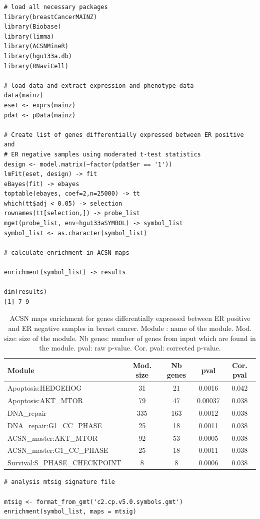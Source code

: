 \documentclass[article]{jss}
\begin{document}
\begin{verbatim}
# load all necessary packages
library(breastCancerMAINZ)
library(Biobase)
library(limma)
library(ACSNMineR)
library(hgu133a.db)
library(RNaviCell)

# load data and extract expression and phenotype data 
data(mainz)
eset <- exprs(mainz)
pdat <- pData(mainz)

# Create list of genes differentially expressed between ER positive and 
# ER negative samples using moderated t-test statistics 
design <- model.matrix(~factor(pdat$er == '1'))
lmFit(eset, design) -> fit
eBayes(fit) -> ebayes
toptable(ebayes, coef=2,n=25000) -> tt
which(tt$adj < 0.05) -> selection
rownames(tt[selection,]) -> probe_list
mget(probe_list, env=hgu133aSYMBOL) -> symbol_list
symbol_list <- as.character(symbol_list)

# calculate enrichment in ACSN maps 

enrichment(symbol_list) -> results

dim(results)
[1] 7 9
\end{verbatim}

\begin{table}[h!]
  \centering
  \caption{ACSN maps enrichment for genes differentially expressed between ER
positive and ER negative samples in breast cancer.  Module : name of the
module. Mod. size: size of the module. Nb genes: number of genes from input
which are found in the module. pval: raw p-value. Cor. pval: corrected p-value.}
\label{tab:table_mainz}

\begin{tabular}{l|c|c|c|c}
\hline
Module & Mod. size & Nb genes & pval & Cor. pval\\
\hline
Apoptosis:HEDGEHOG & 31 & 21 & 0.0016 & 0.042 \\
Apoptosis:AKT\_MTOR &  79 & 47 & 0.00037 & 0.038 \\
DNA\_repair & 335 & 163 & 0.0012 & 0.038 \\
DNA\_repair:G1\_CC\_PHASE &  25 & 18 & 0.0011 & 0.038 \\
ACSN\_master:AKT\_MTOR & 92 & 53 & 0.0005 & 0.038 \\
ACSN\_master:G1\_CC\_PHASE & 25 & 18 & 0.0011 & 0.038 \\
Survival:S\_PHASE\_CHECKPOINT & 8 & 8 & 0.0006 & 0.038 \\
\hline

\end{tabular}
\end{table}

\begin{verbatim}
# analysis mtsig signature file

mtsig <- format_from_gmt('c2.cp.v5.0.symbols.gmt')
enrichment(symbol_list, maps = mtsig)

\end{verbatim}
\end{document}
